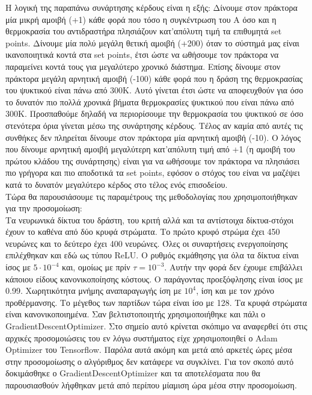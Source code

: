 \documentclass[11pt]{article} %
\numberwithin{equation}{subsection}
\begin{document}
Η λογική της παραπάνω συνάρτησης κέρδους είναι η εξής: Δίνουμε στον πράκτορα μία μικρή αμοιβή (+1) κάθε φορά που τόσο η συγκέντρωση του Α όσο και η θερμοκρασία του αντιδραστήρα πλησιάζουν κατ'απόλυτη τιμή τα επιθυμητά set points. Δίνουμε μία πολύ μεγάλη θετική αμοιβή (+200) όταν το σύστημά μας είναι ικανοποιητικά κοντά στα set points, έτσι ώστε να ωθήσουμε τον πράκτορα να παραμείνει κοντά τους για μεγαλύτερο χρονικό διάστημα. Επίσης δίνουμε στον πράκτορα μεγάλη αρνητική αμοιβή (-100) κάθε φορά που η δράση της θερμοκρασίας του ψυκτικού είναι πάνω από 300K. Αυτό γίνεται έτσι ώστε να αποφευχθούν για όσο το δυνατόν πιο πολλά χρονικά βήματα θερμοκρασίες ψυκτικού που είναι πάνω από 300K. Προσπαθούμε δηλαδή να περιορίσουμε την θερμοκρασία του ψυκτικού σε όσο στενότερα όρια γίνεται μέσω της συνάρτησης κέρδους. Τέλος αν καμία από αυτές τις συνθήκες δεν πληρείται δίνουμε στον πράκτορα μία αρνητική αμοιβή (-10). Ο λόγος που δίνουμε αρνητική αμοιβή μεγαλύτερη κατ'απόλυτη τιμή από +1 (η αμοιβή του πρώτου κλάδου της συνάρτησης) είναι για να ωθήσουμε τον πράκτορα να πλησιάσει πιο γρήγορα και πιο αποδοτικά τα set points, εφόσον ο στόχος του είναι να μαζέψει κατά το δυνατόν μεγαλύτερο κέρδος στο τέλος ενός επισοδείου.\\

Τώρα θα παρουσιάσουμε τις παραμέτρους της μεθοδολογίας που χρησιμοποιήθηκαν για την προσομοίωση:\\

Τα νευρωνικά δίκτυα του δράστη, του κριτή αλλά και τα αντίστοιχα δίκτυα-στόχοι έχουν το καθένα από δύο κρυφά στρώματα. Το πρώτο κρυφό στρώμα έχει 450 νευρώνες και το δεύτερο έχει 400 νευρώνες. Όλες οι συναρτήσεις ενεργοποίησης επιλέχθηκαν και εδώ ως τύπου ReLU. Ο ρυθμός εκμάθησης για όλα τα δίκτυα είναι ίσος με $5 \cdot 10^{-4}$ και, ομοίως με πρίν $\tau = 10^{-3}$. Αυτήν την φορά δεν έχουμε επιβάλλει κάποιου είδους κανονικοποίησης κόστους. Ο παράγοντας προεξόφλησης είναι ίσος με 0.99. Χωρητικότητα μνήμης αναπαραγωγής ίση με $10^{4}$, ίση και με τον χρόνο προθέρμανσης. Το μέγεθος των παρτίδων τώρα είναι ίσο με 128. Τα κρυφά στρώματα είναι κανονικοποιημένα. Σαν βελτιστοποιητής χρησιμοποιήθηκε και πάλι ο GradientDescentOptimizer. Στο σημείο αυτό κρίνεται σκόπιμο να αναφερθεί ότι στις αρχικές προσομοιώσεις του εν λόγω συστήματος είχε χρησιμοποιηθεί ο Adam Optimizer \cite{adam} του Tensorflow. Παρόλα αυτά ακόμη και μετά από αρκετές ώρες μέσα στην προσομοίωσης ο αλγόριθμος δεν κατάφερε να συγκλίνει. Για τον σκοπό αυτό δοκιμάσθηκε ο GradientDescentOptimizer και τα αποτελέσματα που θα παρουσιασθούν λήφθηκαν μετά από περίπου μίαμιση ώρα μέσα στην προσομοίωση.\\
\end{document}
